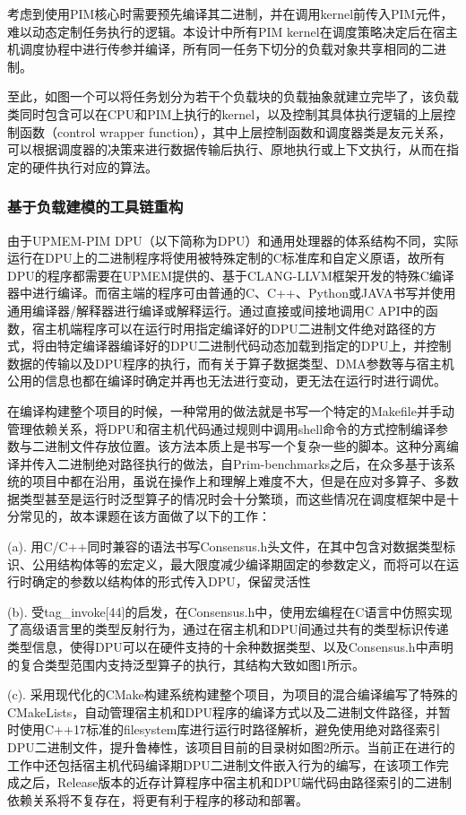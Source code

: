     考虑到使用PIM核心时需要预先编译其二进制，并在调用kernel前传入PIM元件，难以动态定制任务执行的逻辑。本设计中所有PIM kernel在调度策略决定后在宿主机调度协程中进行传参并编译，所有同一任务下切分的负载对象共享相同的二进制。

    至此，如图一个可以将任务划分为若干个负载块的负载抽象就建立完毕了，该负载类同时包含可以在CPU和PIM上执行的kernel，以及控制其具体执行逻辑的上层控制函数（control wrapper function），其中上层控制函数和调度器类是友元关系，可以根据调度器的决策来进行数据传输后执行、原地执行或上下文执行，从而在指定的硬件执行对应的算法。
    
    \subsubsection{基于负载建模的工具链重构}\label{subsubsec:toolchain_refractor}
    由于UPMEM-PIM DPU（以下简称为DPU）和通用处理器的体系结构不同，实际运行在DPU上的二进制程序将使用被特殊定制的C标准库和自定义原语，故所有DPU的程序都需要在UPMEM提供的、基于CLANG-LLVM框架开发的特殊C编译器中进行编译。而宿主端的程序可由普通的C、C++、Python或JAVA书写并使用通用编译器/解释器进行编译或解释运行。通过直接或间接地调用C API中的函数，宿主机端程序可以在运行时用指定编译好的DPU二进制文件绝对路径的方式，将由特定编译器编译好的DPU二进制代码动态加载到指定的DPU上，并控制数据的传输以及DPU程序的执行，而有关于算子数据类型、DMA参数等与宿主机公用的信息也都在编译时确定并再也无法进行变动，更无法在运行时进行调优。

    在编译构建整个项目的时候，一种常用的做法就是书写一个特定的Makefile并手动管理依赖关系，将DPU和宿主机代码通过规则中调用shell命令的方式控制编译参数与二进制文件存放位置。该方法本质上是书写一个复杂一些的脚本。这种分离编译并传入二进制绝对路径执行的做法，自Prim-benchmarks之后，在众多基于该系统的项目中都在沿用，虽说在操作上和理解上难度不大，但是在应对多算子、多数据类型甚至是运行时泛型算子的情况时会十分繁琐，而这些情况在调度框架中是十分常见的，故本课题在该方面做了以下的工作：
    
    (a). 用C/C++同时兼容的语法书写Consensus.h头文件，在其中包含对数据类型标识、公用结构体等的宏定义，最大限度减少编译期固定的参数定义，而将可以在运行时确定的参数以结构体的形式传入DPU，保留灵活性

    (b). 受tag\_invoke[44]的启发，在Consensus.h中，使用宏编程在C语言中仿照实现了高级语言里的类型反射行为，通过在宿主机和DPU间通过共有的类型标识传递类型信息，使得DPU可以在硬件支持的十余种数据类型、以及Consensus.h中声明的复合类型范围内支持泛型算子的执行，其结构大致如图1所示。

    (c). 采用现代化的CMake构建系统构建整个项目，为项目的混合编译编写了特殊的CMakeLists，自动管理宿主机和DPU程序的编译方式以及二进制文件路径，并暂时使用C++17标准的filesystem库进行运行时路径解析，避免使用绝对路径索引DPU二进制文件，提升鲁棒性，该项目目前的目录树如图2所示。当前正在进行的工作中还包括宿主机代码编译期DPU二进制文件嵌入行为的编写，在该项工作完成之后，Release版本的近存计算程序中宿主机和DPU端代码由路径索引的二进制依赖关系将不复存在，将更有利于程序的移动和部署。


